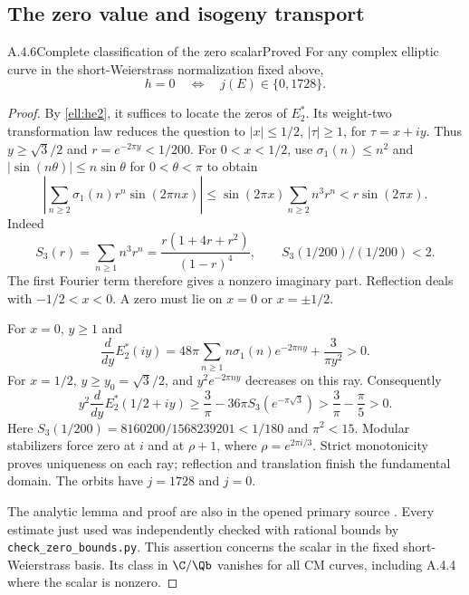 \subsection{The zero value and isogeny transport}

\begin{result}{A.4.6}{Complete classification of the zero scalar}{Proved}
For any complex elliptic curve in the short-Weierstrass normalization fixed above,
\[
 h=0\quad\Longleftrightarrow\quad j(E)\in\{0,1728\}.
\]
\end{result}
\begin{proof}
By \eqref{ell:he2}, it suffices to locate the zeros of $E_2^*$. Its weight-two transformation law reduces the question to $|x|\le1/2$, $|\tau|\ge1$, for $\tau=x+iy$. Thus $y\ge\sqrt3/2$ and $r=e^{-2\pi y}<1/200$. For $0<x<1/2$, use $\sigma_1(n)\le n^2$ and $|\sin(n\theta)|\le n\sin\theta$ for $0<\theta<\pi$ to obtain
\[
 \left|\sum_{n\ge2}\sigma_1(n)r^n\sin(2\pi nx)\right|
 \le\sin(2\pi x)\sum_{n\ge2}n^3r^n
 <r\sin(2\pi x).
\]
Indeed
\[
 S_3(r)=\sum_{n\ge1}n^3r^n=\frac{r(1+4r+r^2)}{(1-r)^4},
 \qquad S_3(1/200)/(1/200)<2.
\]
The first Fourier term therefore gives a nonzero imaginary part. Reflection deals with $-1/2<x<0$. A zero must lie on $x=0$ or $x=\pm1/2$.

For $x=0$, $y\ge1$ and
\[
 \frac d{dy}E_2^*(iy)=48\pi\sum_{n\ge1}n\sigma_1(n)e^{-2\pi ny}
 +\frac3{\pi y^2}>0.
\]
For $x=1/2$, $y\ge y_0=\sqrt3/2$, and $y^2e^{-2\pi ny}$ decreases on this ray. Consequently
\[
 y^2\frac d{dy}E_2^*(1/2+iy)
 \ge\frac3\pi-36\pi S_3(e^{-\pi\sqrt3})
 >\frac3\pi-\frac\pi5>0.
\]
Here $S_3(1/200)=8160200/1568239201<1/180$ and $\pi^2<15$. Modular stabilizers force zero at $i$ and at $\rho+1$, where $\rho=e^{2\pi i/3}$. Strict monotonicity proves uniqueness on each ray; reflection and translation finish the fundamental domain. The orbits have $j=1728$ and $j=0$.

The analytic lemma and proof are also in the opened primary source \cite[Lemma 8.1, printed pp.25--26]{EllSebbarBesrour2026}. Every estimate just used was independently checked with rational bounds by \texttt{check\_zero\_bounds.py}. This assertion concerns the scalar in the fixed short-Weierstrass basis. Its class in $\C/\Qb$ vanishes for all CM curves, including A.4.4 where the scalar is nonzero.
\end{proof}

